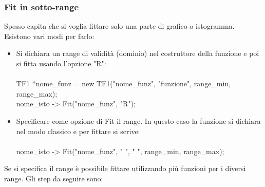 \documentclass[10pt,a4paper]{article}
\begin{document}
 \subsubsection*{Fit in sotto-range}
 Spesso capita che si voglia fittare solo una parte di grafico o istogramma. Esistono vari modi per farlo:
 \begin{itemize}
 	\item Si dichiara un range di validità (dominio) nel costruttore della funzione e poi si fitta usando l'opzione "R":\\\\
 	TF1 *nome\_funz = new TF1("nome\_funz", "funzione", range\_min, range\_max);\\
 	nome\_isto -> Fit("nome\_funz", "R");\\
 	\item Specificare come opzione di Fit il range. In questo caso la funzione si dichiara nel modo classico e per fittare si scrive:\\\\
 	nome\_isto -> Fit("nome\_funz", " ", " ", range\_min, range\_max); 	
 \end{itemize}
Se si specifica il range è possibile fittare utilizzando più funzioni per i diversi range. Gli step da seguire sono:
\end{document}

